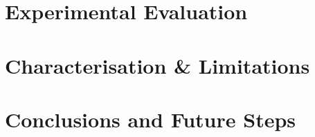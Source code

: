 \documentclass[letterpaper, 10 pt, conference]{ieeeconf}
\begin{document}
\section{Experimental Evaluation}
  \label{section:results}
  

\section{Characterisation \& Limitations}
  \label{section:characterisation}
  

\section{Conclusions and Future Steps}
  \label{section:finale}
  

\cleardoublepage




\balance
\end{document}
